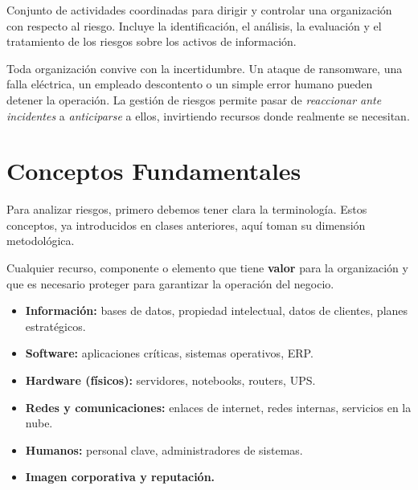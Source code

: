 \documentclass[11pt,a4paper]{article}
\begin{document}
\begin{definicion}
Conjunto de actividades coordinadas para dirigir y controlar una organización con respecto al riesgo. Incluye la identificación, el análisis, la evaluación y el tratamiento de los riesgos sobre los activos de información.
\end{definicion}

\begin{reflexion}
Toda organización convive con la incertidumbre. Un ataque de ransomware, una falla eléctrica, un empleado descontento o un simple error humano pueden detener la operación. La gestión de riesgos permite pasar de \textit{reaccionar ante incidentes} a \textit{anticiparse} a ellos, invirtiendo recursos donde realmente se necesitan.
\end{reflexion}

\section{Conceptos Fundamentales}
Para analizar riesgos, primero debemos tener clara la terminología. Estos conceptos, ya introducidos en clases anteriores, aquí toman su dimensión metodológica.

\begin{definicion}
Cualquier recurso, componente o elemento que tiene \textbf{valor} para la organización y que es necesario proteger para garantizar la operación del negocio.
\end{definicion}

\begin{ejemplo}
\begin{itemize}[leftmargin=*]
  \item \textbf{Información:} bases de datos, propiedad intelectual, datos de clientes, planes estratégicos.
  \item \textbf{Software:} aplicaciones críticas, sistemas operativos, ERP.
  \item \textbf{Hardware (físicos):} servidores, notebooks, routers, UPS.
  \item \textbf{Redes y comunicaciones:} enlaces de internet, redes internas, servicios en la nube.
  \item \textbf{Humanos:} personal clave, administradores de sistemas.
  \item \textbf{Imagen corporativa y reputación.}
\end{itemize}
\end{ejemplo}
\end{document}
